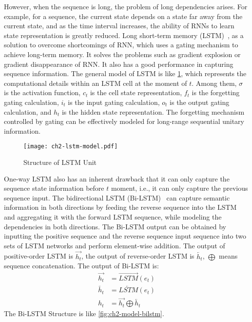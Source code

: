 However, when the sequence is long, the problem of long dependencies arises. For example, for a sequence, the current state depends on a state far away from the current state, and as the time interval increases, the ability of RNNs to learn state representation is greatly reduced. Long short-term memory (LSTM)~\cite{lstm1997}, as a solution to overcome shortcomings of RNN, which uses a gating mechanism to achieve long-term memory. It solves the problems such as gradient explosion or gradient disappearance of RNN. It also has a good performance in capturing sequence information. The general model of LSTM is like \figurename{\ref{fig:ch2-lstm-model}}, which represents the computational details within an LSTM cell at the moment of \(t\). Among them, \(\sigma\) is the activation function, \(c_t\) is the cell state representation, \(f_t\) is the forgetting gating calculation, \(i_t\) is the input gating calculation, \(o_t\) is the output gating calculation, and \(h_t\) is the hidden state representation. The forgetting mechanism controlled by gating can be effectively modeled for long-range sequential unitary information.

\begin{figure}[H]
	\centering
	\texttt{[image: ch2-lstm-model.pdf]}
	\caption{Structure of LSTM Unit}\label{fig:ch2-lstm-model}
\end{figure}

One-way LSTM also has an inherent drawback that it can only capture the sequence state information before \(t\) moment, i.e., it can only capture the previous sequence input. The bidirectional LSTM (Bi-LSTM)~\cite{graves2005framewise} can capture semantic information in both directions by feeding the reverse sequence into the LSTM and aggregating it with the forward LSTM sequence, while modeling the dependencies in both directions. The Bi-LSTM output can be obtained by inputting the positive sequence and the reverse sequence input sequence into two sets of LSTM networks and perform element-wise addition. The output of positive-order LSTM is \(\overrightarrow{h_t}\), the output of reverse-order LSTM is \(\overleftarrow{h_t}\), \(\bigoplus \) means sequence concatenation. The output of Bi-LSTM is:
\begin{align}
	\overrightarrow{h_t} & = \overrightarrow{LSTM}(e_t)                       \\
	\overleftarrow{h_t}  & = \overleftarrow{LSTM}(e_t)                        \\
	h_t                  & =\overrightarrow{h_t}\bigoplus \overleftarrow{h_t}
\end{align}
The Bi-LSTM Structure is like \figurename{\ref{fig:ch2-model-bilstm}}.

